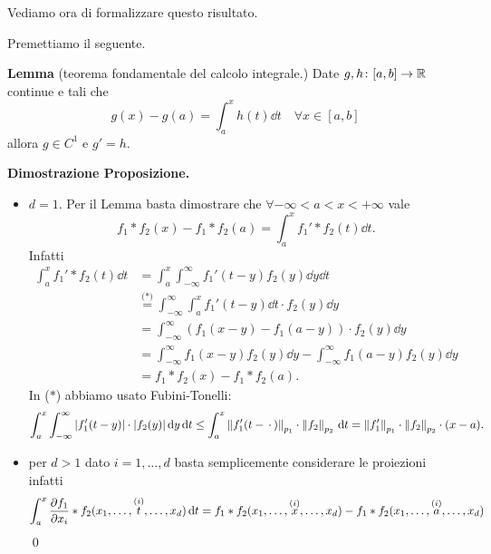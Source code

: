 Vediamo ora di formalizzare questo risultato.



Premettiamo il seguente.

\textbf{Lemma} (teorema fondamentale del calcolo integrale.) Date $g,h \colon [a,b] \to \mathbb R$ continue e tali che
$$
	g(x) - g(a) = \int_a^x h(t) \dd t \quad \forall x \in [a,b]
$$
allora $g \in C^1$ e $g' = h$.

\newpage

\textbf{Dimostrazione Proposizione.}
\begin{itemize}
	\item $d = 1$. Per il Lemma basta dimostrare che $\forall -\infty < a < x < +\infty$ vale
	$$
		f_1 \ast f_2(x) - f_1 \ast f_2(a) = \int_a^x f_1' \ast f_2(t) \dd t.
	$$
	Infatti
		$$
		\begin{aligned}
			\int_a^x f_1' \ast f_2 (t) \dd t
			& = \int_a^x \int_{-\infty}^\infty f_1'(t - y) f_2(y) \dd y \dd t \\
			& \overset{\text{($*$)}}{=} \int_{-\infty}^\infty \int_a^x f_1'(t - y) \dd t \cdot f_2(y) \dd y \\
			& = \int_{-\infty}^\infty (f_1(x - y) - f_1(a - y)) \cdot f_2(y) \dd y \\
			& = \int_{-\infty}^\infty f_1(x - y) f_2(y) \dd y - \int_{-\infty}^\infty f_1(a - y) f_2(y) \dd y \\
			& = f_1 \ast f_2(x) - f_1 \ast f_2(a).
		\end{aligned}
		$$
		In ($*$) abbiamo usato Fubini-Tonelli:
		$$
			\int_a^x \int_{-\infty}^\infty |f_1'(t-y)| \cdot |f_2(y)| \,\mathrm{d} y \,\mathrm{d} t
			\leq \int_a^x \left\lVert f_1'(t - \,\cdot\,) \right\rVert_{p_1} \cdot \left\lVert f_2 \right\rVert_{p_2} \,\mathrm{d} t 
			= \left\lVert f_1' \right\rVert_{p_1} \cdot \left\lVert f_2 \right\rVert_{p_2} \cdot (x - a).
		$$

	\item
		per $d > 1$ dato $i = 1, \dots, d$ basta semplicemente considerare le proiezioni infatti
		$$
		\int_a^x \frac{\partial f_1}{\partial x_i} \ast f_2 (x_1, \dots, \overset{\text{($i$)}}{t}, \dots, x_d) \,\mathrm{d} t
		= f_1 \ast f_2 (x_1, \dots, \overset{\text{($i$)}}{x}, \dots, x_d) - f_1 \ast f_2 (x_1, \dots, \overset{\text{($i$)}}{a}, \dots, x_d)
		$$
		\qed
\end{itemize}

